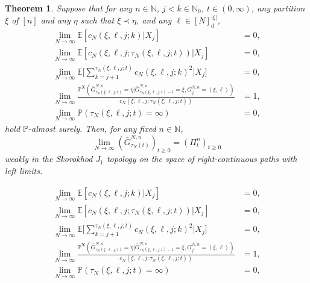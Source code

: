 \documentclass[10pt,a4paper]{amsart}
\newtheorem{thm}{Theorem}
\newcommand{\bbE}{\mathbb{E}}
\newcommand{\bbN}{\mathbb{N}}
\newcommand{\bbP}{\mathbb{P}}
\newcommand{\bfX}{\mathbf{X}}
\begin{document}
\begin{thm}\label{thm:main_result}
Suppose that for any $n \in \bbN$, $j < k \in \bbN_0$, $t \in ( 0, \infty )$, any partition $\xi$ of $[n]$ and any $\eta$ such that $\xi \prec \eta$, and any $\ell \in [ N ]_d^{ | \xi | }$,
\begin{align}
\lim_{ N \to \infty } \bbE[ c_N( \xi, \ell, j; k ) | X_j ] &= 0, \label{kingman_assumption_1} \\
\lim_{ N \to \infty } \bbE[ c_N( \xi, \ell, j; \tau_N( \xi, \ell, j; t ) ) | X_j ] &= 0, \label{kingman_assumption_2} \\
\lim_{ N \to \infty } \bbE\Bigg[ \sum_{ k = j + 1 }^{ \tau_N( \xi, \ell, j; t ) } c_N( \xi, \ell, j; k )^2 \Big| X_j \Bigg] &= 0, \label{kingman_assumption_3} \\
\lim_{ N \to \infty } \frac{ \bbP^{ \bfX }( \bar{ G }_{ \tau_N( \xi, \ell, j; t ) }^{ N, n } = \eta | \bar{ G }_{ \tau_N( \xi, \ell, j; t ) - 1 }^{ N, n } = \xi, G_j^{ N, n } = ( \xi, \ell ) ) }{ c_N( \xi, \ell, j; \tau_N( \xi, \ell, j; t ) ) } &= 1, \label{kingman_assumption_4}\\
\lim_{N \to \infty} \bbP( \tau_N( \xi, \ell, j; t ) = \infty ) &= 0, \label{timescale_assumption}
\end{align}
hold $\bbP$-almost surely.
Then, for any fixed $n \in \bbN$,
\begin{equation*}
\lim_{ N \to \infty } ( \bar{ G }_{ \tau_N( t ) }^{ N, n } )_{ t \geq 0 } = ( \Pi_t^n )_{ t \geq 0 }
\end{equation*}
weakly in the Skorokhod $J_1$ topology on the space of right-continuous paths with left limits.
\end{thm}

\begin{align}
\lim_{ N \to \infty } \bbE[ c_N( \xi, \ell, j; k ) | X_j ] &= 0,  \\
\lim_{ N \to \infty } \bbE[ c_N( \xi, \ell, j; \tau_N( \xi, \ell, j; t ) ) | X_j ] &= 0,  \\
\lim_{ N \to \infty } \bbE\Bigg[ \sum_{ k = j + 1 }^{ \tau_N( \xi, \ell, j; t ) } c_N( \xi, \ell, j; k )^2 \Big| X_j \Bigg] &= 0,  \\
\lim_{ N \to \infty } \frac{ \bbP^{ \bfX }( \bar{ G }_{ \tau_N( \xi, \ell, j; t ) }^{ N, n } = \eta | \bar{ G }_{ \tau_N( \xi, \ell, j; t ) - 1 }^{ N, n } = \xi, G_j^{ N, n } = ( \xi, \ell ) ) }{ c_N( \xi, \ell, j; \tau_N( \xi, \ell, j; t ) ) } &= 1, \\
\lim_{N \to \infty} \bbP( \tau_N( \xi, \ell, j; t ) = \infty ) &= 0, 
\end{align}
\end{document}
